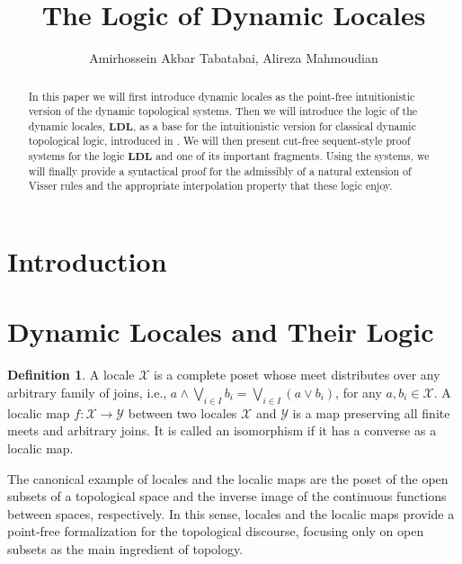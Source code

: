 \documentclass[12pt,a4paper]{article}
\theoremstyle{plain}
\theoremstyle{definition}
\newtheorem{dfn}[thm]{Definition}
\begin{document}
\title{The Logic of Dynamic Locales}


\author[]{Amirhossein Akbar Tabatabai, Alireza Mahmoudian}

\affil[]{ }


\date{ }

\maketitle


\begin{abstract}
In this paper we will first introduce dynamic locales as the point-free intuitionistic version of the dynamic topological systems. Then we will introduce the logic of the dynamic locales, $\mathbf{LDL}$, as a base for the intuitionistic version for classical dynamic topological logic, introduced in \cite{Artemov}. We will then present cut-free sequent-style proof systems for the logic $\mathbf{LDL}$ and one of its important fragments. Using the systems, we will finally provide a syntactical proof for the admissibly of a natural extension of Visser rules and the appropriate interpolation property that these logic enjoy.
\end{abstract}

\section{Introduction}


\section{Dynamic Locales and Their Logic} \label{DynamicLocales}

\begin{dfn}
A locale $\mathscr{X}$ is a complete poset whose meet distributes over any arbitrary family of joins, i.e., $a \wedge \bigvee_{i \in I} b_i=\bigvee_{i \in I} (a \vee b_i)$, for any $a, b_i \in \mathscr{X}$. A localic map $f: \mathscr{X} \to \mathscr{Y}$ between two locales $\mathscr{X}$ and $\mathscr{Y}$ is a map preserving all finite meets and arbitrary joins. It is called an isomorphism if it has a converse as a localic map.
\end{dfn}

The canonical example of locales and the localic maps are the poset of the open subsets of a topological space and the inverse image of the continuous functions between spaces, respectively. In this sense, locales and the localic maps provide a point-free formalization for the topological discourse, focusing only on open subsets as the main ingredient of topology.
\end{document}
